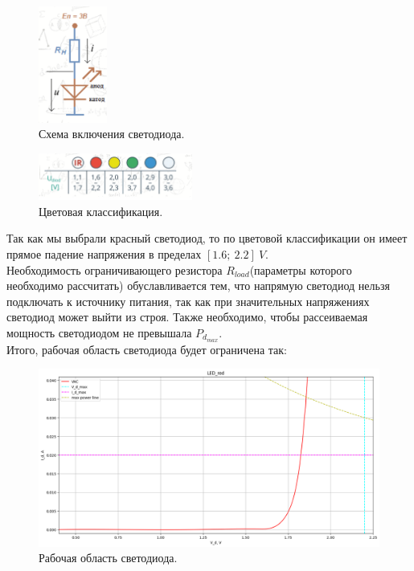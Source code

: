 \documentclass[12pt]{article}
\begin{document}
\begin{figure}[H]
    \centering
    \includegraphics[width=0.2\textwidth]{last_scheme.png}
    \caption{Схема включения светодиода.}
    \label{fig:last_scheme}
\end{figure}

\begin{figure}[H]
    \centering
    \includegraphics[width=0.45\textwidth]{colors_diod.png}
    \caption{Цветовая классификация.}
    \label{fig:colors_diod}
\end{figure}

Так как мы выбрали красный светодиод, то по цветовой классификации он имеет прямое падение напряжения в пределах $[1.6; \ 2.2] \ V$. \\
Необходимость ограничивающего резистора $R_{load}$(параметры которого необходимо рассчитать) обуславливается тем, что напрямую светодиод нельзя подключать к источнику питания, так как при значительных напряжениях светодиод может выйти из строя. Также необходимо, чтобы рассеиваемая мощность светодиодом не превышала $P_{d_{max}}$. \\
Итого, рабочая область светодиода будет ограничена так:

\begin{figure}[H]
    \centering
    \includegraphics[width=\textwidth]{work_area_custom.png}
    \caption{Рабочая область светодиода.}
    \label{fig:work_area_custom}
\end{figure}
\end{document}
